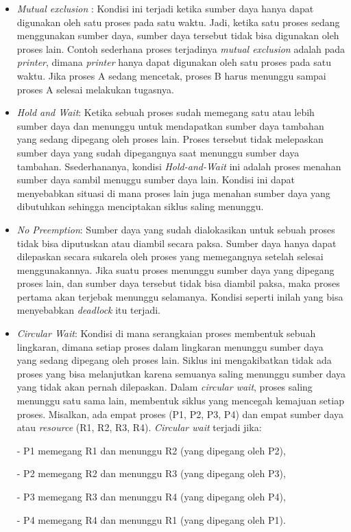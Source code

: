 \documentclass[12pt]{article}
\begin{document}
\begin{itemize}
    \item \textit{Mutual exclusion} : Kondisi ini terjadi ketika sumber daya hanya dapat digunakan oleh satu proses pada satu waktu. Jadi, ketika satu proses sedang menggunakan sumber daya, sumber daya tersebut tidak bisa digunakan oleh proses lain. Contoh sederhana proses terjadinya \textit{mutual exclusion} adalah pada \textit{printer}, dimana \textit{printer} hanya dapat digunakan oleh satu proses pada satu waktu. Jika proses A sedang mencetak, proses B harus menunggu sampai proses A selesai melakukan tugasnya.
    
    \item \textit{Hold and Wait}: Ketika sebuah proses sudah memegang satu atau lebih sumber daya dan menunggu untuk mendapatkan sumber daya tambahan yang sedang dipegang oleh proses lain. Proses tersebut tidak melepaskan sumber daya yang sudah dipegangnya saat menunggu sumber daya tambahan. Ssederhananya, kondisi \textit{Hold-and-Wait} ini adalah proses menahan sumber daya sambil menuggu sumber daya lain.  Kondisi ini dapat menyebabkan situasi di mana proses lain juga menahan sumber daya yang dibutuhkan sehingga menciptakan siklus saling menunggu.
    
    \item \textit{No Preemption}:  Sumber daya yang sudah dialokasikan untuk sebuah proses tidak bisa diputuskan atau diambil secara paksa. Sumber daya hanya dapat dilepaskan secara sukarela oleh proses yang memegangnya setelah selesai menggunakannya. Jika suatu proses menunggu sumber daya yang dipegang proses lain, dan sumber daya tersebut tidak bisa diambil paksa, maka proses pertama akan terjebak menunggu selamanya. Kondisi seperti inilah yang bisa menyebabkan \textit{deadlock} itu terjadi.
    
    \item \textit{Circular Wait}:  Kondisi di mana serangkaian proses membentuk sebuah lingkaran, dimana setiap proses dalam lingkaran menunggu sumber daya yang sedang dipegang oleh proses lain. Siklus ini mengakibatkan tidak ada proses yang bisa melanjutkan karena semuanya saling menunggu sumber daya yang tidak akan pernah dilepaskan.
    Dalam \textit{circular wait}, proses saling menunggu satu sama lain, membentuk siklus yang mencegah kemajuan setiap proses. Misalkan, ada empat proses (P1, P2, P3, P4) dan empat sumber daya atau \textit{resource} (R1, R2, R3, R4). \textit{Circular wait} terjadi jika:

    - P1 memegang R1 dan menunggu R2 (yang dipegang oleh P2),
    
    - P2 memegang R2 dan menunggu R3 (yang dipegang oleh P3),
    
    - P3 memegang R3 dan menunggu R4 (yang dipegang oleh P4),
    
    - P4 memegang R4 dan menunggu R1 (yang dipegang oleh P1).
\end{itemize}
\begin{enumerate}

\end{enumerate}
\end{document}
